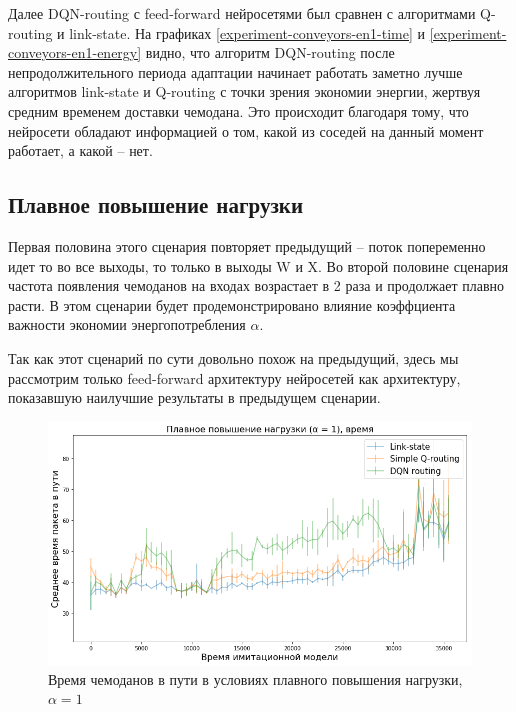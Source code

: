 \documentclass[specification, annotation]{itmo-student-thesis}
\begin{document}
Далее DQN-routing с feed-forward нейросетями был сравнен с алгоритмами Q-routing
и link-state.
На графиках \ref{experiment-conveyors-en1-time} и
\ref{experiment-conveyors-en1-energy} видно, что алгоритм DQN-routing после
непродолжительного периода адаптации начинает работать заметно лучше алгоритмов
link-state и Q-routing с точки зрения экономии энергии, жертвуя средним временем
доставки чемодана. Это происходит благодаря тому, что нейросети обладают
информацией о том, какой из соседей на данный момент работает, а какой -- нет.

\subsection{Плавное повышение нагрузки}\label{experiments:conveyors/load}

Первая половина этого сценария повторяет предыдущий -- поток попеременно идет то
во все выходы, то только в выходы W и X. Во второй половине сценария частота
появления чемоданов на входах возрастает в 2 раза и продолжает плавно расти. В
этом сценарии будет продемонстрировано влияние коэффциента важности экономии
энергопотребления $\alpha$.

Так как этот сценарий по сути довольно похож на предыдущий, здесь мы рассмотрим
только feed-forward архитектуру нейросетей как архитектуру, показавшую наилучшие
результаты в предыдущем сценарии.

\begin{figure}[!h]
  \caption{Время чемоданов в пути в условиях плавного повышения нагрузки,
    $\alpha = 1$}\label{experiment-conveyors-a1-time}
  \centering
  \includegraphics[scale=0.6]{experiment-conveyors-a1-time}
\end{figure}
\end{document}
